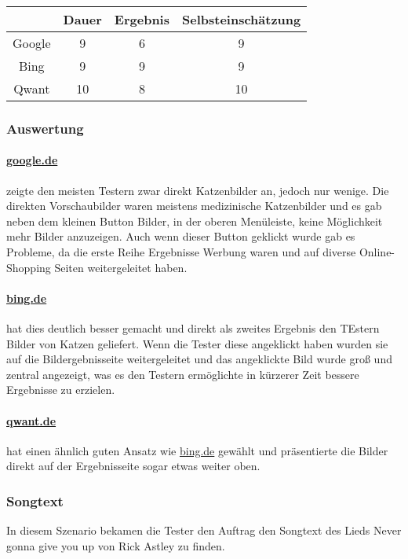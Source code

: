 \begin{tabular}{|c|c|c|c|}
    \hline
    & Dauer & Ergebnis & Selbsteinschätzung \\
    \hline
    Google & 9     & 6        & 9                  \\
    \hline
    Bing   & 9     & 9        & 9                  \\
    \hline
    Qwant  & 10    & 8       & 10                 \\
    \hline
\end{tabular}

\subsubsection*{Auswertung}
\paragraph{\url{google.de}} zeigte den meisten Testern zwar direkt Katzenbilder an, jedoch nur wenige.
Die direkten Vorschaubilder waren meistens medizinische Katzenbilder und es gab neben dem kleinen Button Bilder, in der oberen Menüleiste, keine Möglichkeit mehr Bilder anzuzeigen.
Auch wenn dieser Button geklickt wurde gab es Probleme, da die erste Reihe Ergebnisse Werbung waren und auf diverse Online-Shopping Seiten weitergeleitet haben.\\

\paragraph{\url{bing.de}} hat dies deutlich besser gemacht und direkt als zweites Ergebnis den TEstern Bilder von Katzen geliefert.
Wenn die Tester diese angeklickt haben wurden sie auf die Bildergebnisseite weitergeleitet und das angeklickte Bild wurde groß und zentral angezeigt,
was es den Testern ermöglichte in kürzerer Zeit bessere Ergebnisse zu erzielen.\\

\paragraph{\url{qwant.de}} hat einen ähnlich guten Ansatz wie \url{bing.de} gewählt und präsentierte die Bilder direkt auf der Ergebnisseite sogar etwas weiter oben.

\subsubsection{Songtext}\label{subsubsec:szenario3}
In diesem Szenario bekamen die Tester den Auftrag den Songtext des Lieds Never gonna give you up von Rick Astley zu finden.

